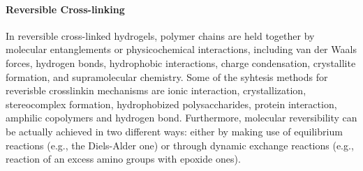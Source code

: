 \paragraph{Reversible Cross-linking}
In reversible cross-linked hydrogels, polymer chains are held together by molecular entanglements or physicochemical interactions, including van der Waals forces, hydrogen bonds, hydrophobic interactions, charge condensation, crystallite formation, and supramolecular chemistry\citep{bustamante-torresHydrogelsClassificationAccording2021,maitraCrosslinkingHydrogelsReview2014}.
Some of the syhtesis methods for reverisble crosslinkin mechanisms are ionic interaction, crystallization, stereocomplex formation, hydrophobized polysaccharides, protein interaction, amphilic copolymers and hydrogen bond\citep{maitraCrosslinkingHydrogelsReview2014,bustamante-torresHydrogelsClassificationAccording2021}.
Furthermore, molecular reversibility can be actually achieved in two different ways: either by making use of equilibrium reactions (e.g., the Diels-Alder one) or through dynamic exchange reactions (e.g., reaction of an excess amino groups with epoxide ones)\citep{picchioniHydrogelsBasedDynamic2018}. 

